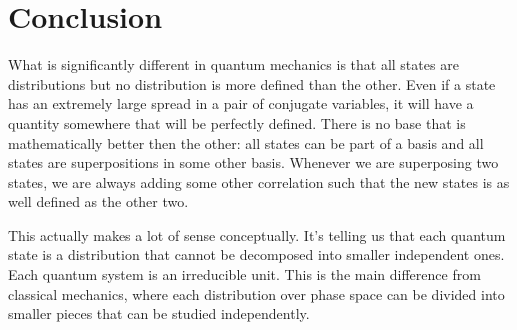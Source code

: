 \documentclass[aps,pra,10pt,floatfix,nofootinbib]{revtex4-1}
\theoremstyle{definition}
\begin{document}
\section{Conclusion}

What is significantly different in quantum mechanics is that all states are distributions but no distribution is more defined than the other. Even if a state has an extremely large spread in a pair of conjugate variables, it will have a quantity somewhere that will be perfectly defined. There is no base that is mathematically better then the other: all states can be part of a basis and all states are superpositions in some other basis. Whenever we are superposing two states, we are always adding some other correlation such that the new states is as well defined as the other two.

This actually makes a lot of sense conceptually. It's telling us that each quantum state is a distribution that cannot be decomposed into smaller independent ones. Each quantum system is an irreducible unit. This is the main difference from classical mechanics, where each distribution over phase space can be divided into smaller pieces that can be studied independently.
\end{document}
